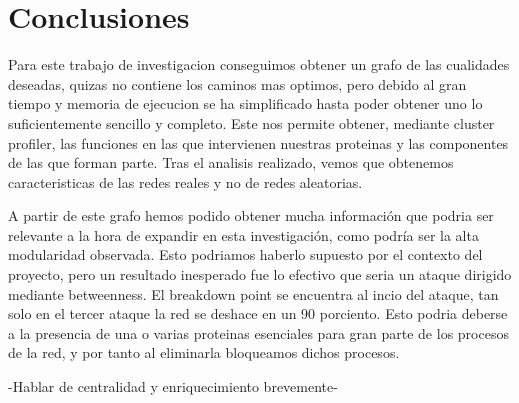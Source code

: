 \section{Conclusiones}
Para este trabajo de investigacion conseguimos obtener un grafo de las cualidades deseadas, quizas no contiene los caminos mas optimos, pero debido al gran tiempo y memoria de ejecucion se ha simplificado hasta poder obtener uno lo suficientemente sencillo y completo. Este nos permite obtener, mediante cluster profiler, las funciones en las que intervienen nuestras proteinas y las componentes de las que forman parte. Tras el analisis realizado, vemos que obtenemos caracteristicas de las redes reales y no de redes aleatorias. 

A partir de este grafo hemos podido obtener mucha información que podria ser relevante a la hora de expandir en esta investigación, como podría ser la alta modularidad observada.
Esto podriamos haberlo supuesto por el contexto del proyecto, pero un resultado inesperado fue lo efectivo que seria un ataque dirigido mediante betweenness. El breakdown point se encuentra al incio del ataque, tan solo en el tercer ataque la red se deshace en un 90 porciento. Esto podria deberse a la presencia de una o varias proteinas esenciales para gran parte de los procesos de la red, y por tanto al eliminarla bloqueamos dichos procesos.

-Hablar de centralidad y enriquecimiento brevemente-
